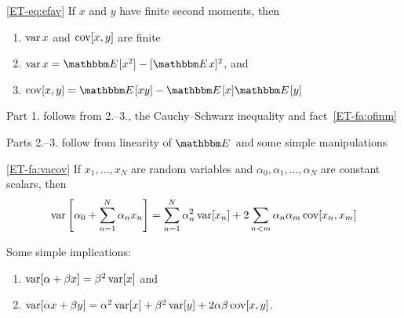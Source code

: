 \begin{frame}

    \vspace{2em}
    \Fact\eqref{ET-eq:efav}
    If $x$ and $y$ have finite second moments, then
    \begin{enumerate}
        \item $\operatorname{var} x$ and $\operatorname{cov}[x, y]$ are finite
        \item $\var x = \EE [x^2] - [\EE x]^2$, and
        \item $\cov[x, y] = \EE [ xy] -\EE[x] \EE[y]$
    \end{enumerate}

    Part 1. follows from 2.--3., the Cauchy--Schwarz inequality  and
    fact~\ref{ET-fa:ofinm}
    
    Parts 2.--3. follow from linearity of $\EE$ and
    some simple manipulations

\end{frame}

\begin{frame}

    \vspace{2em}
    \Fact\eqref{ET-fa:vacov}
    If $x_1,\ldots,x_N$ are random variables and 
    $\alpha_0, \alpha_1,\ldots,\alpha_N$ are constant scalars, then
    \begin{equation*}
        \operatorname{var} \left[ \alpha_0 + \sum_{n=1}^N \alpha_n x_n \right]
        =  \sum_{n=1}^N \alpha_n^2 \operatorname{var}[ x_n ]   
                + 2 \sum_{n < m} \alpha_n \alpha_m \operatorname{cov}[x_n, x_m] 
    \end{equation*}
    
    \vspace{1em}
    Some simple implications:
    \begin{enumerate}
        \item $\operatorname{var}[\alpha + \beta x] = \beta^2 \operatorname{var}[x]$ and
        \item $\operatorname{var}[\alpha x + \beta y] = \alpha^2 \operatorname{var}[x] + \beta^2 \operatorname{var}[y] + 2
            \alpha \beta \operatorname{cov}[x,y]$.
    \end{enumerate}
    
\end{frame}

